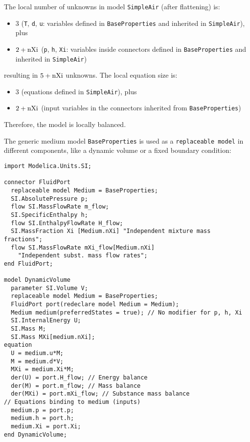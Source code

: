 \begin{example}
The local number of unknowns in model \lstinline!SimpleAir! (after flattening) is:
\begin{itemize}
\item
  $3$ (\lstinline!T!, \lstinline!d!, \lstinline!u!: variables defined in
  \lstinline!BaseProperties! and inherited in \lstinline!SimpleAir!), plus
\item
  $2 + \text{\lstinline!nXi!}$ (\lstinline!p!, \lstinline!h!, \lstinline!Xi!: variables inside
  connectors defined in \lstinline!BaseProperties! and inherited in \lstinline!SimpleAir!)
\end{itemize}
resulting in $5 + \text{\lstinline!nXi!}$ unknowns. The local equation size is:
\begin{itemize}
\item
  $3$ (equations defined in \lstinline!SimpleAir!), plus
\item
  $2 + \text{\lstinline!nXi!}$ (input variables in the connectors inherited from \lstinline!BaseProperties!)
\end{itemize}

Therefore, the model is locally balanced.

The generic medium model \lstinline!BaseProperties! is used as a
\lstinline!replaceable model! in different components, like a dynamic
volume or a fixed boundary condition:
\begin{lstlisting}[language=modelica]
import Modelica.Units.SI;

connector FluidPort
  replaceable model Medium = BaseProperties;
  SI.AbsolutePressure p;
  flow SI.MassFlowRate m_flow;
  SI.SpecificEnthalpy h;
  flow SI.EnthalpyFlowRate H_flow;
  SI.MassFraction Xi [Medium.nXi] "Independent mixture mass fractions";
  flow SI.MassFlowRate mXi_flow[Medium.nXi]
    "Independent subst. mass flow rates";
end FluidPort;

model DynamicVolume
  parameter SI.Volume V;
  replaceable model Medium = BaseProperties;
  FluidPort port(redeclare model Medium = Medium);
  Medium medium(preferredStates = true); // No modifier for p, h, Xi
  SI.InternalEnergy U;
  SI.Mass M;
  SI.Mass MXi[medium.nXi];
equation
  U = medium.u*M;
  M = medium.d*V;
  MXi = medium.Xi*M;
  der(U) = port.H_flow; // Energy balance
  der(M) = port.m_flow; // Mass balance
  der(MXi) = port.mXi_flow; // Substance mass balance
// Equations binding to medium (inputs)
  medium.p = port.p;
  medium.h = port.h;
  medium.Xi = port.Xi;
end DynamicVolume;
\end{lstlisting}


\end{example}
